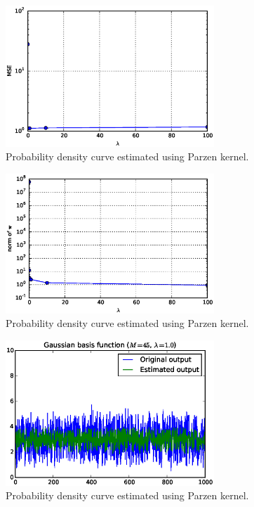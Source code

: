 \documentclass[a4paper,12pt]{article}
\begin{document}
\begin{figure}[htb]
 \centering
 \includegraphics[width=0.7\textwidth]{./figures/7f1.eps}
 \caption{Probability density curve estimated using Parzen kernel.}
 \label{fig:7f1}
\end{figure}
\begin{figure}[htb]
 \centering
 \includegraphics[width=0.7\textwidth]{./figures/7f2.eps}
 \caption{Probability density curve estimated using Parzen kernel.}
 \label{fig:7f2}
\end{figure}
\begin{figure}[htb]
 \centering
 \includegraphics[width=0.7\textwidth]{./figures/7f3.eps}
 \caption{Probability density curve estimated using Parzen kernel.}
 \label{fig:7f3}
\end{figure}
\end{document}
